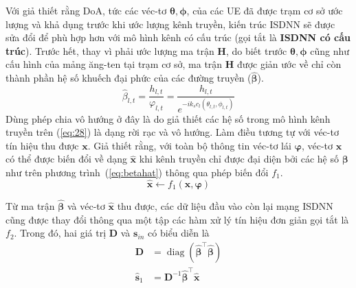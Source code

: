 Với giả thiết rằng DoA, tức các véc-tơ $\boldsymbol\theta, \boldsymbol\phi$, của các UE đã được trạm cơ sở ước lượng và khả dụng trước khi ước lượng kênh truyền, kiến trúc ISDNN sẽ được sửa đổi để phù hợp hơn với mô hình kênh có cấu trúc (gọi tắt là \textbf{ISDNN có cấu trúc}). Trước hết, thay vì phải ước lượng ma trận $\mathbf{H}$, do biết trước $\boldsymbol\theta, \boldsymbol\phi$ cũng như cấu hình của mảng ăng-ten tại trạm cơ sở, ma trận $\mathbf{H}$ được giản ước về chỉ còn thành phần hệ số khuếch đại phức của các đường truyền ($\hat{\boldsymbol{\beta}}$).
\begin{equation}
\label{eq:betahat}
    \hat{\beta}_{l, t} = \frac{h_{l, t}} {\varphi_{l,t}}= \frac{h_{l, t}}{e^{-i k_s c_l (\theta_{l,t}, \phi_{l, t})}}
\end{equation}
Dùng phép chia vô hướng ở đây là do giả thiết các hệ số trong mô hình kênh truyền trên (\ref{eq:28}) là dạng rời rạc và vô hướng. Làm điều tương tự với véc-tơ tín hiệu thu được $\mathbf{x}$. Giả thiết rằng, với toàn bộ thông tin véc-tơ lái $\boldsymbol{\varphi}$, véc-tơ $\mathbf{x}$ có thể được biến đổi về dạng $\hat{\mathbf{x}}$ khi kênh truyền chỉ được đại diện bởi các hệ số $\boldsymbol{\beta}$ như trên phương trình~(\ref{eq:betahat}) thông qua phép biến đổi $f_1$.
\begin{equation}
    \hat{\mathbf{x}} \longleftarrow f_1(\mathbf{x}, \boldsymbol{\varphi})
\end{equation}

Từ ma trận $\hat{\boldsymbol{\beta}}$ và véc-tơ $\hat{\mathbf{x}}$ thu được, các dữ liệu đầu vào còn lại mạng ISDNN cũng được thay đổi thông qua một tập các hàm xử lý tín hiệu đơn giản gọi tắt là $f_2$. Trong đó, hai giá trị $\mathbf{D}$ và $\mathbf{s}_{in}$ có biểu diễn là
\begin{equation}
    \begin{aligned}
        \mathbf{D} &= \operatorname{diag}(\hat{\boldsymbol{\beta}}^\top \hat{\boldsymbol{\beta}}) \\
        \hat{\mathbf{s}}_{1} &= \mathbf{D}^{-1} \hat{\boldsymbol{\beta}}^\top \hat{\mathbf{x}}
    \end{aligned}
\end{equation}

